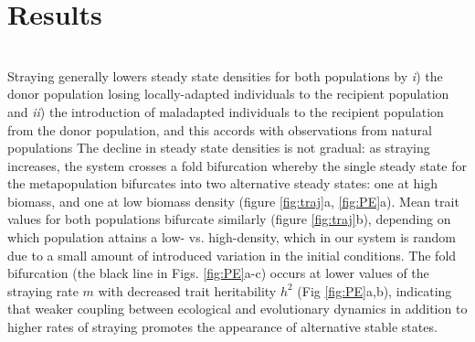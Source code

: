 \documentclass[twocolumn,preprintnumbers,amsmath,amssymb,superscriptaddress]{revtex4}
\begin{document}
\section{Results}





 \\
\noindent Straying generally lowers steady state densities for both populations by \emph{i}) the donor population losing locally-adapted individuals to the recipient population and \emph{ii}) the introduction of maladapted individuals to the recipient population from the donor population, and this accords with observations from natural populations \cite{Bett:2017ha} %
The decline in steady state densities is not gradual: as straying increases, the system crosses a fold bifurcation whereby the single steady state for the metapopulation bifurcates into two alternative steady states: one at high biomass, and one at low biomass density (figure \ref{fig:traj}a, \ref{fig:PE}a).
Mean trait values for both populations bifurcate similarly (figure \ref{fig:traj}b), depending on which population attains a low- vs. high-density, which in our system is random due to a small amount of introduced variation in the initial conditions.
The fold bifurcation (the black line in Figs. \ref{fig:PE}a-c) occurs at lower values of the straying rate $m$ with decreased trait heritability $h^2$ (Fig \ref{fig:PE}a,b), indicating that weaker coupling between ecological and evolutionary dynamics in addition to higher rates of straying promotes the appearance of alternative stable states.
\end{document}
